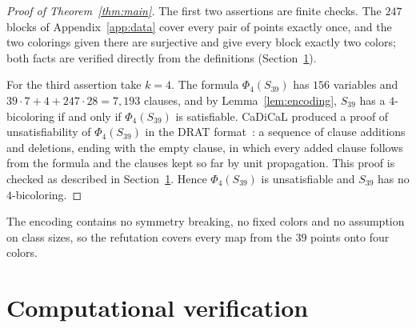 \documentclass[11pt]{article}
\theoremstyle{definition}
\begin{document}
\begin{proof}[Proof of Theorem~\ref{thm:main}]
The first two assertions are finite checks. The $247$ blocks of
Appendix~\ref{app:data} cover every pair of points exactly once, and the
two colorings given there are surjective and give every block exactly two
colors; both facts are verified directly from the definitions
(Section~\ref{sec:verification}).

For the third assertion take $k=4$. The formula $\Phi_4(S_{39})$ has $156$
variables and $39\cdot 7+4+247\cdot 28=7{,}193$ clauses, and by
Lemma~\ref{lem:encoding}, $S_{39}$ has a $4$-bicoloring if and only if
$\Phi_4(S_{39})$ is satisfiable. CaDiCaL produced a proof of
unsatisfiability of $\Phi_4(S_{39})$ in the DRAT format~\cite{DRATtrim}: a
sequence of clause additions and deletions, ending with the empty clause,
in which every added clause follows from the formula and the clauses kept
so far by unit propagation. This proof is checked as described in
Section~\ref{sec:verification}. Hence $\Phi_4(S_{39})$ is unsatisfiable and
$S_{39}$ has no $4$-bicoloring.
\end{proof}

The encoding contains no symmetry breaking, no fixed colors and no
assumption on class sizes, so the refutation covers every map from the
$39$ points onto four colors.

\section{Computational verification}\label{sec:verification}
\end{document}
